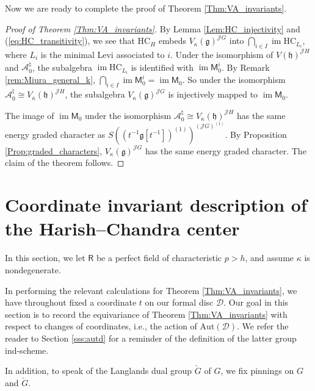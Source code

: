 \documentclass{amsart}
\theoremstyle{definition}
\newcommand{\D}{\sD}
\newcommand{\sD}{\mathscr{D}}
\newcommand{\on}{\mathrm}
\newcommand{\Ring}{\mathsf{R}}
\newcommand{\g}{\mathfrak{g}}
\newcommand{\h}{\mathfrak{h}}
\newcommand{\HC}{\mathrm{HC}} %
\newcommand{\A}{\mathscr{A}}
\newcommand{\Jet}{\mathscr{J}}
\newcommand{\Aut}{\on{Aut}}
\numberwithin{equation}{section}
\begin{document}
Now we are ready to complete the proof of Theorem \ref{Thm:VA_invariants}.
\begin{proof}[Proof of Theorem \ref{Thm:VA_invariants}]
By Lemma \ref{Lem:HC_injectivity} and (\ref{eq:HC_transitivity}), we see that 
$\HC_H$ embeds $V_\kappa(\g)^{\Jet G}$ into $\bigcap_{i\in I}\operatorname{im}\HC_{L_i}$, where $L_i$ is the minimal Levi associated to $i$. Under the isomorphism of $V(\h)^{\Jet H}$ and $\A^\natural_0$, the subalgebra $\operatorname{im} \HC_{L_i}$ is identified with $\operatorname{im}\mathsf{M}^i_0$. By Remark \ref{rem:Miura_general_k},
$\bigcap_{i\in I}\operatorname{im}\mathsf{M}^i_0=\operatorname{im}\mathsf{M}_0$. So under the isomorphism $\A^\natural_0\cong V_\kappa(\h)^{\Jet H}$, the subalgebra $V_\kappa(\g)^{\Jet G}$ is injectively mapped to $\operatorname{im}\mathsf{M}_0$.

The image of
$\operatorname{im}\mathsf{M}_0$ under the isomorphism $\A^\natural_0\cong V_\kappa(\h)^{\Jet H}$
has the same energy graded character as $S((t^{-1}\g[t^{-1}])^{(1)})^{(\Jet G)^{(1)}}$. By Proposition \ref{Prop:graded_characters}, $V_\kappa(\g)^{\Jet G}$ has the same energy graded character. The claim of the theorem follows. 
 \end{proof}



\section{Coordinate invariant description of the Harish--Chandra center}\label{S_coord_indep}


In this section, we let $\Ring$ be a perfect field of characteristic $p>h$, and {assume $\kappa$ is nondegenerate}.

In performing the relevant calculations for Theorem \ref{Thm:VA_invariants}, we have throughout fixed a coordinate $t$ on our formal disc $\D$. Our goal in this section is to record the equivariance of Theorem \ref{Thm:VA_invariants} with respect to changes of coordinates, i.e., the action of $\Aut(\sD)$. {We refer the reader to Section \ref{sss:autd} for a reminder of the definition of the latter group ind-scheme.} 

{ In addition, to speak of the Langlands dual group $\check{G}$ of $G$, we fix pinnings on $G$ and $\check{G}$.}
\end{document}
